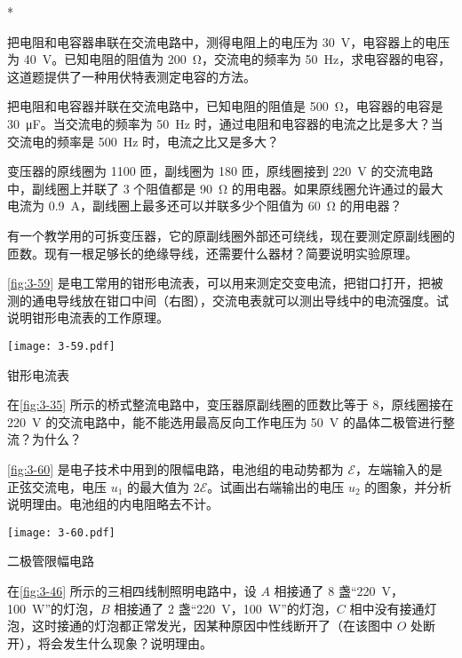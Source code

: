 \begin{Exercise}*
\begin{question}
  \item 把电阻和电容器串联在交流电路中，测得电阻上的电压为 \qty{30}{V}，电容器上的电压为 \qty{40}{V}。已知电阻的阻值为 \qty{200}{\ohm}，交流电的频率为 \qty{50}{Hz}，求电容器的电容，这道题提供了一种用伏特表测定电容的方法。
  \item 把电阻和电容器并联在交流电路中，已知电阻的阻值是 \qty{500}{\ohm}，电容器的电容是 \qty{30}{\micro F}。当交流电的频率为 \qty{50}{Hz} 时，通过电阻和电容器的电流之比是多大？当交流电的频率是 \qty{500}{Hz} 时，电流之比又是多大？
  \item 变压器的原线圈为 1100 匝，副线圈为 180 匝，原线圈接到 \qty{220}{V} 的交流电路中，副线圈上并联了 3 个阻值都是 \qty{90}{\ohm} 的用电器。如果原线圈允许通过的最大电流为 \qty{0.9}{A}，副线圈上最多还可以并联多少个阻值为 \qty{60}{\ohm} 的用电器？
  \item 有一个教学用的可拆变压器，它的原副线圈外部还可绕线，现在要测定原副线圈的匝数。现有一根足够长的绝缘导线，还需要什么器材？简要说明实验原理。
  \item \cref{fig:3-59} 是电工常用的钳形电流表，可以用来测定交变电流，把钳口打开，把被测的通电导线放在钳口中间（右图），交流电表就可以测出导线中的电流强度。试说明钳形电流表的工作原理。
  \begin{figurehere}
    \begin{minipage}{\linewidth}\centering
      \texttt{[image: 3-59.pdf]}
      \caption{钳形电流表}\label{fig:3-59}
    \end{minipage}
  \end{figurehere}
  \item 在\cref{fig:3-35} 所示的桥式整流电路中，变压器原副线圈的匝数比等于 8，原线圈接在 \qty{220}{V} 的交流电路中，能不能选用最高反向工作电压为 \qty{50}{V} 的晶体二极管进行整流？为什么？
  \item \cref{fig:3-60} 是电子技术中用到的限幅电路，电池组的电动势都为 $\mathcal{E}$，左端输入的是正弦交流电，电压 $u_1$ 的最大值为 $2\mathcal{E}$。试画出右端输出的电压 $u_2$ 的图象，并分析说明理由。电池组的内电阻略去不计。
  \begin{figurehere}
    \begin{minipage}{\linewidth}\centering
      \texttt{[image: 3-60.pdf]}
      \caption{二极管限幅电路}\label{fig:3-60}
    \end{minipage}
  \end{figurehere}
  \item 在\cref{fig:3-46} 所示的三相四线制照明电路中，设 $A$ 相接通了 8 盏“\qty{220}{V}，\qty{100}{W}”的灯泡，$B$ 相接通了 2 盏“\qty{220}{V}，\qty{100}{W}”的灯泡，$C$ 相中没有接通灯泡，这时接通的灯泡都正常发光，因某种原因中性线断开了（在该图中 $O$ 处断开），将会发生什么现象？说明理由。
    

\end{question}
\end{Exercise}

